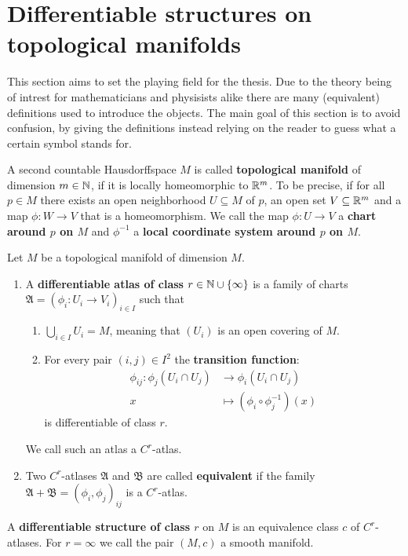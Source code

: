 \section{Differentiable structures on topological manifolds}
This section aims to set the playing field for the thesis. Due to the theory being of intrest for mathematicians and physisists alike there are many (equivalent) definitions used to introduce the objects. The main goal of this section is to avoid confusion, by giving the definitions instead relying on the reader to guess what a certain symbol stands for.
\begin{definition}
	A second countable Hausdorffspace $M$ is called \textbf{topological manifold} of dimension $m\in \mathbb{N}$, if it is locally homeomorphic to $\mathbb{R}^m$. To be precise, if for all $p\in M$ there exists an open neighborhood $U\subseteq M$ of $p$, an open set $V\subseteq \mathbb{R}^m$  and a map $\phi:W\to V$ that is a homeomorphism. We call the map $\phi:U\to V$ a \textbf{chart around $p$ on $M$} and $\phi^{-1}$ a \textbf{local coordinate system around $p$ on $M$}.
\end{definition}
\begin{definition}
	Let $M$ be a topological manifold of dimension $M$. 
	\begin{enumerate}
		\item A \textbf{differentiable atlas of class } $r\in \mathbb{N}\cup\{\infty\}$ is a family of charts $\mathfrak{A}=\left( \phi_i:U_i \to V_i\right)_{i\in I}$ such that
		\begin{enumerate}
			\item $\bigcup_{i\in I}U_i=M$, meaning that $\left( U_i\right)$ is an open covering of $M$.
			\item For every pair $(i,j)\in I^2$ the \textbf{transition function}:
			\begin{align*}
				\phi_{ij}:\phi_j(U_i \cap U_j)&\to \phi_i(U_i \cap U_j)\\
				x                             &\mapsto \left(\phi_i \circ \phi_j^{-1}\right)(x)
			\end{align*}
			is differentiable of class $r$.
		\end{enumerate}
		We call such an atlas a $C^r$-atlas.
		\item Two $C^r$-atlases $\mathfrak{A}$ and $\mathfrak{B}$ are called \textbf{equivalent} if the family $\mathfrak{A}+\mathfrak{B}=\left(\phi_i,\phi_j\right)_{ij}$ is a $C^r$-atlas.
	\end{enumerate}
	A \textbf{differentiable structure of class $r$} on $M$ is an equivalence class $c$ of $C^r$-atlases. 
	For $r=\infty$ we call the pair $(M,c)$ a smooth manifold.
\end{definition}
